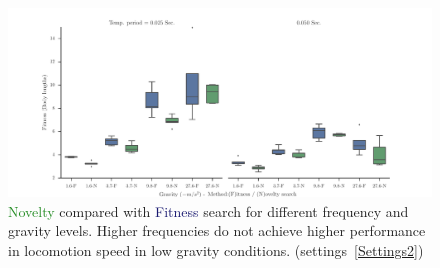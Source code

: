\begin{figure}[ht!]
\centering
\includegraphics[width=1.0\textwidth]{../Figures/Results/GravityExperiment1.pdf}
\caption{\textcolor{ForestGreen}{Novelty} compared with \textcolor{MidnightBlue}{Fitness} search for different frequency and gravity levels. Higher frequencies do not achieve higher performance in locomotion speed in low gravity conditions. (settings~\ref{Settings2})}
\label{fig:GravityExperiment1}
\end{figure}


